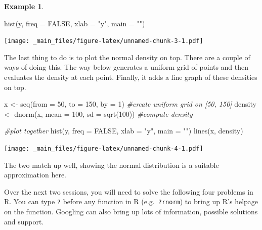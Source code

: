 \documentclass[
]{book}
\newenvironment{Shaded}{\begin{snugshade}}{\end{snugshade}}
\newcommand{\AttributeTok}[1]{\textcolor[rgb]{0.77,0.63,0.00}{#1}}
\newcommand{\CommentTok}[1]{\textcolor[rgb]{0.56,0.35,0.01}{\textit{#1}}}
\newcommand{\ConstantTok}[1]{\textcolor[rgb]{0.00,0.00,0.00}{#1}}
\newcommand{\DecValTok}[1]{\textcolor[rgb]{0.00,0.00,0.81}{#1}}
\newcommand{\FunctionTok}[1]{\textcolor[rgb]{0.00,0.00,0.00}{#1}}
\newcommand{\NormalTok}[1]{#1}
\newcommand{\OtherTok}[1]{\textcolor[rgb]{0.56,0.35,0.01}{#1}}
\newcommand{\StringTok}[1]{\textcolor[rgb]{0.31,0.60,0.02}{#1}}
\theoremstyle{definition}
\theoremstyle{definition}
\newtheorem{example}{Example}[chapter]
\theoremstyle{definition}
\theoremstyle{definition}
\theoremstyle{remark}
\begin{document}
\begin{example}
\begin{Shaded}
\begin{Highlighting}[]
\FunctionTok{hist}\NormalTok{(y, }\AttributeTok{freq =} \ConstantTok{FALSE}\NormalTok{, }\AttributeTok{xlab =} \StringTok{"y"}\NormalTok{, }\AttributeTok{main =} \StringTok{""}\NormalTok{)}
\end{Highlighting}
\end{Shaded}

\texttt{[image: \_main\_files/figure-latex/unnamed-chunk-3-1.pdf]}

The last thing to do is to plot the normal density on top. There are a couple of ways of doing this. The way below generates a uniform grid of points and then evaluates the density at each point. Finally, it adds a line graph of these densities on top.

\begin{Shaded}
\begin{Highlighting}[]
\NormalTok{x }\OtherTok{\textless{}{-}} \FunctionTok{seq}\NormalTok{(}\AttributeTok{from =} \DecValTok{50}\NormalTok{, }\AttributeTok{to =} \DecValTok{150}\NormalTok{, }\AttributeTok{by =} \DecValTok{1}\NormalTok{)           }\CommentTok{\#create uniform grid on [50, 150]}
\NormalTok{density }\OtherTok{\textless{}{-}} \FunctionTok{dnorm}\NormalTok{(x, }\AttributeTok{mean =} \DecValTok{100}\NormalTok{, }\AttributeTok{sd =} \FunctionTok{sqrt}\NormalTok{(}\DecValTok{100}\NormalTok{)) }\CommentTok{\#compute density}

\CommentTok{\#plot together}
\FunctionTok{hist}\NormalTok{(y, }\AttributeTok{freq =} \ConstantTok{FALSE}\NormalTok{, }\AttributeTok{xlab =} \StringTok{"y"}\NormalTok{, }\AttributeTok{main =} \StringTok{""}\NormalTok{)}
\FunctionTok{lines}\NormalTok{(x, density)}
\end{Highlighting}
\end{Shaded}

\texttt{[image: \_main\_files/figure-latex/unnamed-chunk-4-1.pdf]}

The two match up well, showing the normal distribution is a suitable approximation here.
\end{example}

Over the next two sessions, you will need to solve the following four problems in R. You can type \texttt{?} before any function in R (e.g.~\texttt{?rnorm}) to bring up R's helpage on the function. Googling can also bring up lots of information, possible solutions and support.
\end{document}
